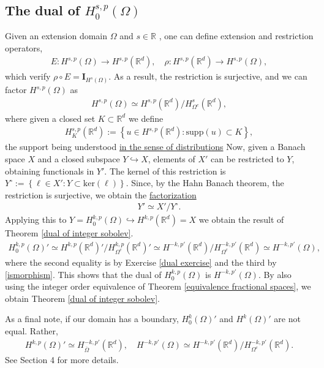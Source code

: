 \documentclass[
    a4paper,
    DIV=14,
    abstract=true,
    numbers=noenddot
]
{scrartcl}
\theoremstyle{definition}
\newcommand{\set}[1]{\left\{#1\right\}}
\newcommand{\Id}{\bm{I}}\renewcommand{\ker}{\bm{ker}}\newcommand{\supp}[1]{\bm{supp}(#1)}\renewcommand{\tr}[1]{\mathrm{tr}\left(#1\right)}
\newcommand{\rm}[1]{\mathrm{#1}}
\newcommand{\R}{\mathbb{R}}
\begin{document}
\subsection{The dual of $H^{s,p}_0(\Omega)$}
Given an extension domain $\Omega $ and $s \in \R$ , one can define extension and restriction operators,
\begin{align*}
    E:H^{s,p}(\Omega ) \to H^{s,p}(\R^d), \quad \rho: H^{s,p}(\R^d) \to H^{s,p}(\Omega ),
\end{align*}
which verify $\rho \circ E = \Id_{H^s(\Omega )}$. As a result, the restriction is surjective, and we can factor $H^{s,p}(\Omega )$ as
\begin{align}\label{ismorphism}
    H^{s,p}(\Omega )\simeq H^{s,p}(\R^d)\slash H^s_{\Omega^c}(\R^d ),
\end{align}
where given a closed set $K \subset \R^d$ we define
\begin{align*}
    H^{s,p}_K(\R^d):= \set{u \in H^{s,p}(\R^d): \rm{supp}(u) \subset K},
\end{align*}
the support being understood \href{https://nowheredifferentiable.com/2023-07-12-PDEs-3-Sobolev_spaces/#:~:text=Support%20of%20a%20distribution}{in the sense of distributions}
Now, given a Banach space $X$ and a closed subspace $Y \hookrightarrow X$, elements of $X'$ can be restricted to $Y$, obtaining functionals in $Y'$. The kernel of this restriction is $Y^\circ:=\set{\ell \in X': Y \subset \rm{ker}(\ell)}$. Since, by the Hahn Banach theorem, the restriction is surjective, we obtain the \href{https://math.la.asu.edu/~quigg/teach/courses/578/2008/notes/adjoints.pdf}{factorization}
\begin{align}\label{dual isomormphism}
    Y' \simeq X'\slash Y^\circ.
\end{align}
Applying this to $Y= H^{k,p}_0(\Omega )\hookrightarrow H^{k,p}(\R^d) =X$ we obtain the result of Theorem \ref{dual of integer sobolev}.
\begin{align*}
    H^{k,p}_0(\Omega )' \simeq H^{k,p}(\R^d)'\slash H^{k,p}_{\Omega^c}(\R^d)'\simeq H^{-k,p'}(\R^d)\slash H^{-k,p'}_{\Omega^c}(\R^d )\simeq H^{-k,p'}(\Omega ),
\end{align*}
where the second equality is by Exercise \ref{dual exercise} and the third by \eqref{ismorphism}.
This shows that the dual of $H^{k,p}_0(\Omega )$ is $H^{-k,p'}(\Omega )$. By also using the integer order equivalence of Theorem \ref{equivalence fractional spaces}, we obtain  Theorem \ref{dual of integer sobolev}.

As a final note, if our domain has a boundary, $H_0^k(\Omega )'$ and $H^k(\Omega )'$ are not equal. Rather,
\begin{align*}
    H^{k,p}(\Omega )'\simeq H_{\overline{\Omega } }^{-k,p'}(\R^d), \quad H^{-k,p'}(\Omega ) \simeq H^{-k,p'}(\R^d)\slash H^{-k,p'}_{{\Omega }^c }(\R^d).
\end{align*}
See \cite{taylor2013partial} Section 4 for more details.
\end{document}
